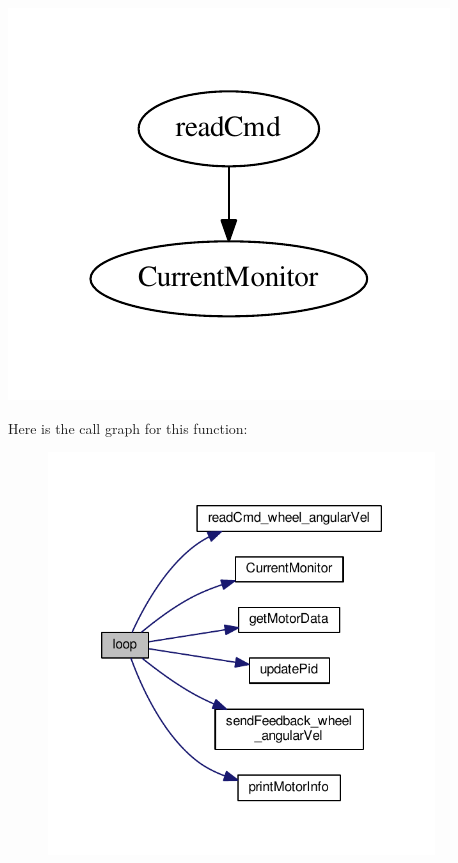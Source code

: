 \begin{center}

\begin{DoxyImageNoCaption}
  \mbox{\includegraphics[width=\textwidth,height=\textheight/2,keepaspectratio=true]{dot_inline_dotgraph_2}}
\end{DoxyImageNoCaption}
\end{center}
 

Here is the call graph for this function\-:\nopagebreak
\begin{figure}[H]
\begin{center}
\leavevmode
\includegraphics[width=290pt]{vnh5019__base_8ino_afe461d27b9c48d5921c00d521181f12f_cgraph}
\end{center}
\end{figure}


